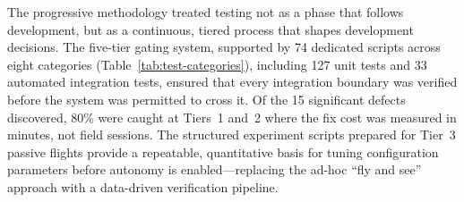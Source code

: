 The progressive methodology treated testing not as a phase that follows development, but as a continuous, tiered process that shapes development decisions. The five-tier gating system, supported by 74 dedicated scripts across eight categories (Table~\ref{tab:test-categories}), including 127 unit tests and 33 automated integration tests, ensured that every integration boundary was verified before the system was permitted to cross it. Of the 15 significant defects discovered, 80\% were caught at Tiers~1 and~2 where the fix cost was measured in minutes, not field sessions. The structured experiment scripts prepared for Tier~3 passive flights provide a repeatable, quantitative basis for tuning configuration parameters before autonomy is enabled---replacing the ad-hoc ``fly and see'' approach with a data-driven verification pipeline.
